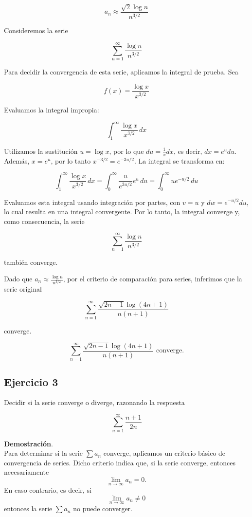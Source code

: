 \documentclass{article}
\begin{document}
    \[
    a_n \approx \frac{\sqrt{2} \log n}{n^{3/2}}
    \]

    Consideremos la serie

    \[
    \sum_{n=1}^{\infty} \frac{\log n}{n^{3/2}}
    \]

    Para decidir la convergencia de esta serie, aplicamos la integral de prueba. Sea

    \[
    f(x) = \frac{\log x}{x^{3/2}}
    \]

    Evaluamos la integral impropia:

    \[
    \int_1^\infty \frac{\log x}{x^{3/2}} \, dx
    \]

    Utilizamos la sustitución $u = \log x$, por lo que $du = \frac{1}{x} dx$, es decir, $dx = e^u du$. Además, $x = e^u$, por lo tanto $x^{-3/2} = e^{-3u/2}$. La integral se transforma en:

    \[
    \int_1^\infty \frac{\log x}{x^{3/2}} \, dx = \int_0^\infty \frac{u}{e^{3u/2}} e^u \, du = \int_0^\infty ue^{-u/2} \, du
    \]

    Evaluamos esta integral usando integración por partes, con $v = u$ y $dw = e^{-u/2} du$, lo cual resulta en una integral convergente. Por lo tanto, la integral converge y, como consecuencia, la serie

    \[
    \sum_{n=1}^\infty \frac{\log n}{n^{3/2}}
    \]

    también converge.

    Dado que $a_n \approx \frac{\log n}{n^{3/2}}$, por el criterio de comparación para series, inferimos que la serie original

    \[
    \sum_{n=1}^\infty \frac{\sqrt{2 n-1} \log (4 n+1)}{n(n+1)}
    \]

    converge.

    \[
     \sum_{n=1}^{\infty} \frac{\sqrt{2 n-1} \log (4 n+1)}{n(n+1)} \text{ converge.}
    \]

    \subsection*{Ejercicio 3}

    Decidir si la serie converge o diverge, razonando la respuesta

    $$
    \sum_{n=1}^{\infty} \frac{n+1}{2 n}
    $$

    \textbf{Demostración}.\\

    Para determinar si la serie $\sum a_{n}$ converge, aplicamos un criterio básico de convergencia de series. Dicho criterio indica que, si la serie converge, entonces necesariamente
    \[
    \lim _{n \rightarrow \infty} a_{n} = 0.
    \]
    En caso contrario, es decir, si
    \[
    \lim _{n \rightarrow \infty} a_{n} \neq 0
    \]
    entonces la serie $\sum a_{n}$ no puede converger.
\end{document}
